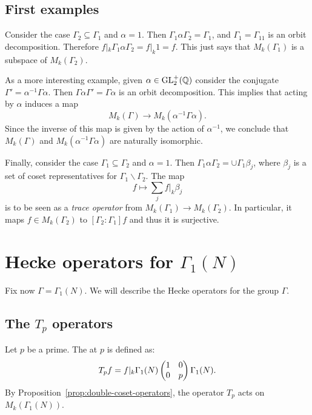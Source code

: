 \subsection{First examples}
Consider the case $\Gamma_2\subseteq \Gamma_1$ and $\alpha=1$. Then $\Gamma_1\alpha\Gamma_2=\Gamma_1$, and $\Gamma_1=\Gamma_11$ is an orbit decomposition. Therefore $f|_k\Gamma_1\alpha\Gamma_2 = f|_k1 = f$. This just says that $M_k(\Gamma_1)$ is a subspace of $M_k(\Gamma_2)$.

As a more interesting example, given $\alpha\in\operatorname{GL}_2^+(\mathbb{Q})$ consider the conjugate $\Gamma'=\alpha^{-1}\Gamma\alpha$. Then $\Gamma\alpha\Gamma'=\Gamma\alpha$ is an orbit decomposition. This implies that acting by $\alpha$ induces a map
\[
M_k(\Gamma)\to M_k(\alpha^{-1}\Gamma\alpha).
\]
Since the inverse of this map is given by the action of $\alpha^{-1}$, we conclude that $M_k(\Gamma)$ and $M_k(\alpha^{-1}\Gamma\alpha)$ are naturally isomorphic.

Finally, consider the case $\Gamma_1\subseteq \Gamma_2$ and $\alpha=1$. Then $\Gamma_1\alpha\Gamma_2 = \cup \Gamma_1 \beta_j$, where $\beta_j$  is a set of coset representatives for $\Gamma_1\backslash \Gamma_2$. The map
\[
f\mapsto \sum_{j} f|_k \beta_j
\]
is to be seen as a \emph{trace operator} from $M_k(\Gamma_1)\to M_k(\Gamma_2)$. In particular, it maps $f\in M_k(\Gamma_2)$ to $[\Gamma_2\colon \Gamma_1]f$ and thus it is surjective.

\section{Hecke operators for \texorpdfstring{$\Gamma_1(N)$}{Gamma1(N)}}
Fix now $\Gamma=\Gamma_1(N)$. We will describe the Hecke operators for the group $\Gamma$.

\subsection{The \texorpdfstring{$T_p$}{Tp} operators}
Let $p$ be a prime. The  at $p$ is defined as:
\[
T_p f = f|_k\Gamma_1(N)\left(\begin{matrix}1&0\\0&p\end{matrix}\right)\Gamma_1(N).
\]
By Proposition~\ref{prop:double-coset-operators}, the operator $T_p$ acts on $M_k(\Gamma_1(N))$.

